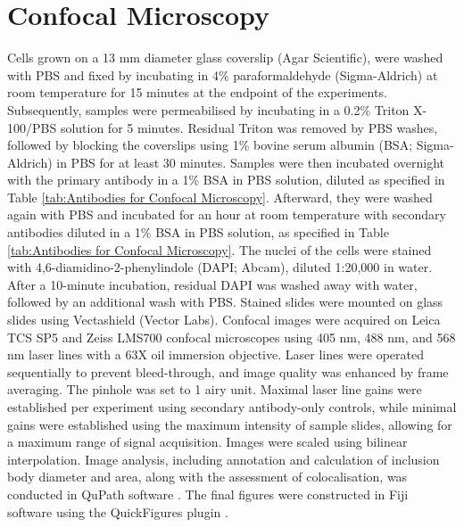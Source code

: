 \section{Confocal Microscopy} \label{sec:Confocal Microscopy}
Cells grown on a 13 mm diameter glass coverslip (Agar Scientific), were washed with PBS and fixed by incubating in 4\% paraformaldehyde (Sigma-Aldrich) at room temperature for 15 minutes at the endpoint of the experiments. Subsequently, samples were permeabilised by incubating in a 0.2\% Triton X-100/PBS solution for 5 minutes. Residual Triton was removed by PBS washes, followed by blocking the coverslips using 1\% bovine serum albumin (BSA; Sigma-Aldrich) in PBS for at least 30 minutes. Samples were then incubated overnight with the primary antibody in a 1\% BSA in PBS solution, diluted as specified in Table \ref{tab:Antibodies for Confocal Microscopy}. Afterward, they were washed again with PBS and incubated for an hour at room temperature with secondary antibodies diluted in a 1\% BSA in PBS solution, as specified in Table \ref{tab:Antibodies for Confocal Microscopy}. The nuclei of the cells were stained with 4,6-diamidino-2-phenylindole (DAPI; Abcam), diluted 1:20,000 in water. After a 10-minute incubation, residual DAPI was washed away with water, followed by an additional wash with PBS. Stained slides were mounted on glass slides using Vectashield (Vector Labs). Confocal images were acquired on Leica TCS SP5 and Zeiss LMS700 confocal microscopes using 405 nm, 488 nm, and 568 nm laser lines with a 63X oil immersion objective. Laser lines were operated sequentially to prevent bleed-through, and image quality was enhanced by frame averaging. The pinhole was set to 1 airy unit. Maximal laser line gains were established per experiment using secondary antibody-only controls, while minimal gains were established using the maximum intensity of sample slides, allowing for a maximum range of signal acquisition. Images were scaled using bilinear interpolation. Image analysis, including annotation and calculation of inclusion body diameter and area, along with the assessment of colocalisation, was conducted in QuPath software \cite{Bankhead2017QuPath:Analysis}. The final figures were constructed in Fiji software \cite{Schindelin2012Fiji:Analysis} using the QuickFigures plugin \cite{Mazo2021QuickFigures:Figures}.


